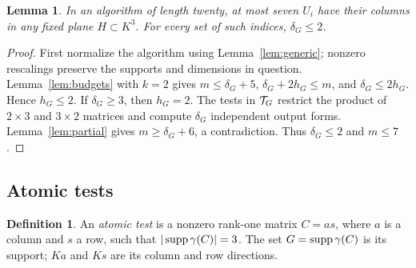 \documentclass[11pt,a4paper]{article}
\numberwithin{equation}{section}
\theoremstyle{plain}
\newtheorem{lemma}[theorem]{Lemma}
\theoremstyle{definition}
\newtheorem{definition}[theorem]{Definition}
\newcommand{\leqs}{\leqslant}\newcommand{\geqs}{\geqslant}
\begin{document}
\begin{lemma}\label{lem:plane}
In an algorithm of length twenty, at most seven $U_i$ have their
columns in any fixed plane $H\subset K^3$. For every set of such
indices, $\delta_G\leqs2$.
\end{lemma}
\begin{proof}
First normalize the algorithm using Lemma~\ref{lem:generic}; nonzero
rescalings preserve the supports and dimensions in question.
Lemma~\ref{lem:budgets} with $k=2$ gives
$m\leqs\delta_G+5$, $\delta_G+2h_G\leqs m$, and
$\delta_G\leqs2h_G$. Hence $h_G\leqs2$.
If $\delta_G\geqs3$, then $h_G=2$. The tests in $\mathcal T_G$ restrict
the product of $2\times3$ and $3\times2$ matrices and compute
$\delta_G$ independent output forms. Lemma~\ref{lem:partial} gives
$m\geqs\delta_G+6$, a contradiction. Thus $\delta_G\leqs2$ and $m\leqs7$.
\end{proof}

\subsection{Atomic tests}

\begin{definition}
An \emph{atomic test} is a nonzero rank-one matrix $C=as$, where $a$
is a column and $s$ a row, such that $|\operatorname{supp}\gamma(C)|=3$.
The set $G=\operatorname{supp}\gamma(C)$ is its support; $Ka$ and $Ks$ are its
column and row directions.
\end{definition}
\end{document}
